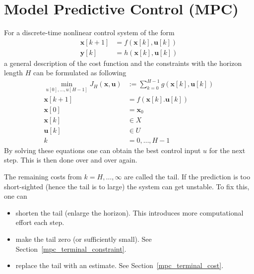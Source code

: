\section{Model Predictive Control (MPC)}

For a discrete-time nonlinear control system of the form
\begin{align*}
    \mathbf{x}[k+1] & = f(\mathbf{x}[k], \mathbf{u}[k]) \\
    \mathbf{y}[k]   & = h(\mathbf{x}[k],\mathbf{u}[k])
\end{align*}
a general description of the cost function and the constraints with the horizon length $H$ can be formulated as following
\begin{align*}
    \min_{u[0], \ldots, u[H-1]} J_{H}(\mathbf{x,u}) & := \sum_{k=0}^{H-1}g(\mathbf{x}[k],\mathbf{u}[k]) \\
    \mathbf{x}[k+1]                                 & = f(\mathbf{x}[k]. \mathbf{u}[k])                 \\
    \mathbf{x}[0]                                   & = \mathbf{x}_0                                    \\
    \mathbf{x}[k]                                   & \in X                                             \\
    \mathbf{u}[k]                                   & \in U                                             \\
    k                                               & = 0,\ldots,H-1
\end{align*}
By solving these equations one can obtain the best control input $u$ for the next step. This is then done over and over again.

\newpar{}

The remaining costs from $k=H, \ldots, \infty$ are called the tail. If the prediction is too short-sighted (hence the tail is to large) the system can get unstable. To fix this, one can
\begin{itemize}
    \item shorten the tail (enlarge the horizon). This introduces more computational effort each step.
    \item make the tail zero (or sufficiently small). See Section~\ref{mpc_terminal_constraint}.
    \item replace the tail with an estimate. See Section~\ref{mpc_terminal_cost}.
\end{itemize}

